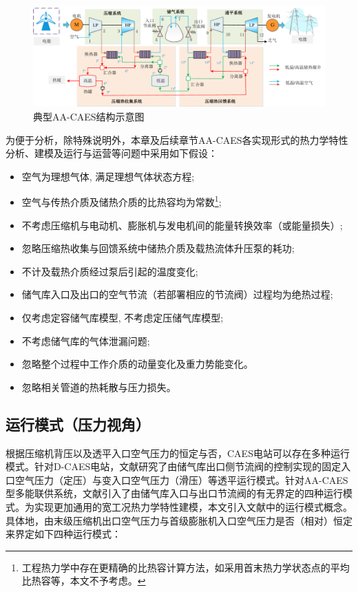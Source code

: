 \begin{figure}[H] %
  \centering
  \includegraphics[scale=0.57]{figures/Chap2-1-AA-CAES-Struc-Thermo.pdf}
  \caption{典型AA-CAES结构示意图}
  \label{fig:CAES-thermal-struc}
\end{figure}

为便于分析，除特殊说明外，本章及后续章节AA-CAES各实现形式的热力学特性分析、建模及运行与运营等问题中采用如下假设：
\begin{itemize}
  \item 空气为理想气体, 满足理想气体状态方程;
  \item 空气与传热介质及储热介质的比热容均为常数\footnote{工程热力学中存在更精确的比热容计算方法，如采用首末热力学状态点的平均比热容等，本文不予考虑。};
  \item 不考虑压缩机与电动机、膨胀机与发电机间的能量转换效率（或能量损失）;
  \item 忽略压缩热收集与回馈系统中储热介质及载热流体升压泵的耗功;
  \item 不计及载热介质经过泵后引起的温度变化;
  \item 储气库入口及出口的空气节流（若部署相应的节流阀）过程均为绝热过程;
  \item 仅考虑定容储气库模型, 不考虑定压储气库模型;
  \item 不考虑储气库的气体泄漏问题;
  \item 忽略整个过程中工作介质的动量变化及重力势能变化。
  \item 忽略相关管道的热耗散与压力损失。
\end{itemize}

\subsection{运行模式（压力视角）}
根据压缩机背压以及透平入口空气压力的恒定与否，CAES电站可以存在多种运行模式。针对D-CAES电站，文献研究了由储气库出口侧节流阀的控制实现的固定入口空气压力（定压）与变入口空气压力（滑压）等透平运行模式。针对AA-CAES型多能联供系统，文献引入了由储气库入口与出口节流阀的有无界定的四种运行模式。为实现更加通用的宽工况热力学特性建模，本文引入文献中的运行模式概念。具体地，由末级压缩机出口空气压力与首级膨胀机入口空气压力是否（相对）恒定来界定如下四种运行模式：

